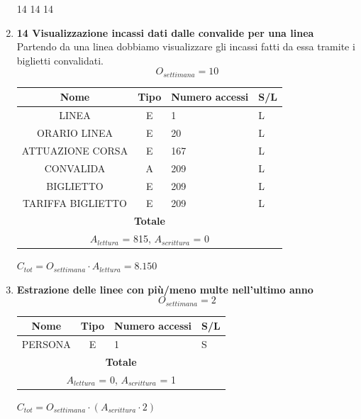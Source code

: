 \documentclass[12pt,a4paper]{report}
\begin{document}
\begin{enumerate}[label=\textbf{\arabic*)}]
14 14 14
\item \textbf{14 Visualizzazione incassi dati dalle convalide per una linea } \\
    Partendo da una linea dobbiamo visualizzare gli incassi fatti da essa tramite i biglietti convalidati.
    \[ {O_{settimana} = 10} \]
    \begin{table}[H]
    \centering
    \begin{tabular}{|c|c|l|l|}
    \hline
    \textbf{Nome} & \textbf{Tipo} & \textbf{Numero accessi} & \textbf{S/L} \\
    \hline
    LINEA & E & 1 & L \\ 
    \hline
    ORARIO LINEA & E & 20 & L \\ 
    \hline
    ATTUAZIONE CORSA & E & 167 & L \\
    \hline
    CONVALIDA & A & 209 & L \\
    \hline
    BIGLIETTO & E & 209 & L \\
    \hline
    TARIFFA BIGLIETTO & E & 209 & L \\
    \hline
    \multicolumn{4}{c}{\textbf{Totale}} \\    
    \multicolumn{4}{c}{${A_{lettura}}$ = 815, ${A_{scrittura}}$ = 0} \\
    \hline
    \end{tabular}
    \end{table}
    \begin{center}
    ${C_{tot} = {O_{settimana}}\cdot {A_{lettura}} = 8.150}$
    \end{center}

    \item \textbf{Estrazione delle linee con più/meno multe nell’ultimo anno} \\
    \[ {O_{settimana} = 2} \]
    \begin{table}[H]
    \centering
    \begin{tabular}{|c|c|l|l|}
    \hline
    \textbf{Nome} & \textbf{Tipo} & \textbf{Numero accessi} & \textbf{S/L} \\
    \hline
    PERSONA & E & 1 & S \\
    \hline
    \multicolumn{4}{c}{\textbf{Totale}} \\    
    \multicolumn{4}{c}{${A_{lettura}}$ = 0, ${A_{scrittura}}$ = 1} \\
    \hline
    \end{tabular}
    \end{table}
    \begin{center}
    ${C_{tot} = {O_{settimana}}\cdot({A_{scrittura}}\cdot 2)}$
    \end{center}


\end{enumerate}
\end{document}
